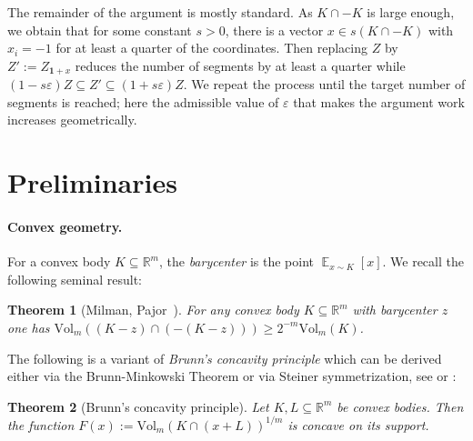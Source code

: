 \documentclass[12pt,english]{article}
\theoremstyle{theorem}
\newtheorem{theorem}{Theorem}
\theoremstyle{remark}
\providecommand{\setR}{\mathbb{R}}
\newcommand{\E}{\mathop{\mathbb{E}}}
\newcommand{\Vol}{\mathrm{Vol}}
\begin{document}
The remainder of the  argument is mostly standard. As $K \cap -K$ is large enough, we obtain that for some constant $s>0$, there is a vector $x \in s(K \cap -K)$ with $x_i = -1$ for at least a quarter of the coordinates. Then replacing $Z$ by $Z' := Z_{\bm{1}+x}$ reduces the number of segments by at least a quarter while $(1-s\varepsilon) Z \subseteq Z' \subseteq (1+s\varepsilon) Z$. We repeat the process until the target number of segments is reached; here the admissible value of $\varepsilon$ that makes the argument work increases geometrically.


\section{Preliminaries}

\paragraph{Convex geometry.} For a convex body $K \subseteq \setR^m$, the \emph{barycenter} is the point $\E_{x \sim K}[x]$.
We recall the following seminal result:

\begin{theorem}[Milman, Pajor~\cite{MilmanPajor2000}] \label{thm:MilmanPajorInequality} 
  For any convex body $K \subseteq \setR^m$ with barycenter $z$ one has $\Vol_m((K-z) \cap (-(K-z))) \geq 2^{-m}\Vol_m(K)$.
\end{theorem}

The following is a variant of \emph{Brunn's concavity principle} which can be derived either via the Brunn-Minkowski Theorem or via Steiner symmetrization, see \cite[Section~1.2]{AsymptoticGeometricAnalysis-Book2015} or \cite[Lemma 1.34]{rothvoss-asymptotic-convex-geometry}:
\begin{theorem}[Brunn's concavity principle] \label{thm:IntersectionConcavity} %
Let $K,L \subseteq \setR^m$ be convex bodies. 
Then the function  $F(x) := \Vol_m(K \cap (x+L))^{1/m}$ is concave on its support.
\end{theorem}
\end{document}
